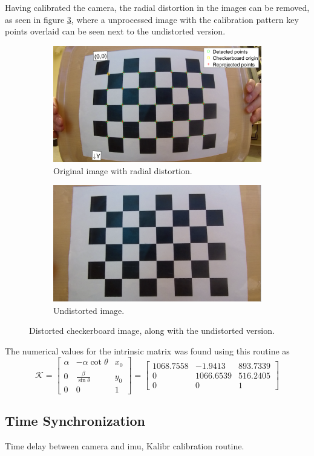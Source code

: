 Having calibrated the camera, the radial distortion in the images can be removed, as seen in figure \ref{fig:distortion}, where a unprocessed image with the calibration pattern key points overlaid can be seen next to the undistorted version.
\begin{figure}[H]
	\centering
	\begin{subfigure}{.5\textwidth}
		\centering
		\includegraphics[width=.8\linewidth]{fig/calibration_distorted.PNG}
		\caption{Original image with radial distortion.}
		\label{fig:sub_distort1}
	\end{subfigure}%
	\begin{subfigure}{.5\textwidth}
		\centering
		\includegraphics[width=.8\linewidth]{fig/calibration_undistorted.PNG}
		\caption{Undistorted image.}
		\label{fig:sub_distort2}
	\end{subfigure}
	\caption{Distorted checkerboard image, along with the undistorted version.}
	\label{fig:distortion}
\end{figure}
The numerical values for the intrinsic matrix was found using this routine as
\begin{equation}
\mathcal{K}=\begin{bmatrix}\alpha & -\alpha\cot{\theta} & x_0\\0 & \frac{\beta}{\sin{\theta}} & y_0\\0 & 0 & 1\end{bmatrix}=\begin{bmatrix}
1068.7558 & -1.9413 & 893.7339 \\ 0 & 1066.6539 &516.2405\\ 0 & 0 & 1
\end{bmatrix}
\end{equation}  
\subsection{Time Synchronization}
Time delay between camera and imu, Kalibr calibration routine.
\cleardoublepage